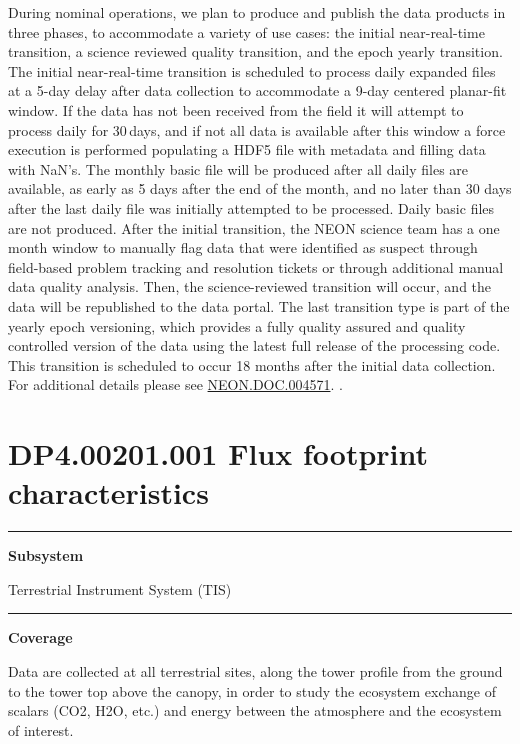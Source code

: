 \documentclass[]{article}
\begin{document}
During nominal operations, we plan to produce and publish the data
products in three phases, to accommodate a variety of use cases: the
initial near-real-time transition, a science reviewed quality
transition, and the epoch yearly transition. The initial near-real-time
transition is scheduled to process daily expanded files at a 5-day delay
after data collection to accommodate a 9-day centered planar-fit window.
If the data has not been received from the field it will attempt to
process daily for 30\,days, and if not all data is available after this
window a force execution is performed populating a HDF5 file with
metadata and filling data with NaN's. The monthly basic file will be
produced after all daily files are available, as early as 5 days after
the end of the month, and no later than 30 days after the last daily
file was initially attempted to be processed. Daily basic files are not
produced. After the initial transition, the NEON science team has a one
month window to manually flag data that were identified as suspect
through field-based problem tracking and resolution tickets or through
additional manual data quality analysis. Then, the science-reviewed
transition will occur, and the data will be republished to the data
portal. The last transition type is part of the yearly epoch versioning,
which provides a fully quality assured and quality controlled version of
the data using the latest full release of the processing code. This
transition is scheduled to occur 18 months after the initial data
collection. For additional details please see
\href{http://data.neonscience.org/documents}{NEON.DOC.004571}. \newpage
.

\section{DP4.00201.001 Flux footprint
characteristics}\label{dp4.00201.001-flux-footprint-characteristics}

\begin{center}\rule{0.5\linewidth}{\linethickness}\end{center}

\textbf{Subsystem}

Terrestrial Instrument System (TIS)

\begin{center}\rule{0.5\linewidth}{\linethickness}\end{center}

\textbf{Coverage}

Data are collected at all terrestrial sites, along the tower profile
from the ground to the tower top above the canopy, in order to study the
ecosystem exchange of scalars (CO2, H2O, etc.) and energy between the
atmosphere and the ecosystem of interest.
\end{document}
